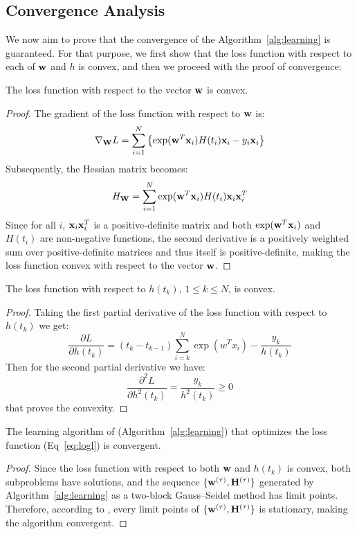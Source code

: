 {\color{red}\subsection{Convergence Analysis}

We now aim to prove that the convergence of the Algorithm~\ref{alg:learning} is guaranteed. For that purpose, we first show that the loss function with respect to each of $\mathbf{w}$ and $h$ is convex, and then we proceed with the proof of convergence:

\begin{lemma}
The loss function with respect to the vector $\mathbf{w}$ is convex.
\end{lemma}
\begin{proof}
The gradient of the loss function with respect to $\mathbf{w}$ is:
\[\nabla_{\mathbf{W}}L=\sum_{i=1}^{N}\left\lbrace\exp(\mathbf{w}^T\mathbf{x}_i)H(t_i)\mathbf{x}_i-y_i\mathbf{x}_i\right\rbrace\]
Subsequently, the Hessian matrix becomes:
\[H_{\mathbf{W}}=\sum_{i=1}^{N}\exp(\mathbf{w}^T\mathbf{x}_i)H(t_i)\mathbf{x}_i\mathbf{x}_i^T\]
Since for all $i$, $\mathbf{x}_i\mathbf{x}_i^T$ is a positive-definite matrix and both $\exp(\mathbf{w}^T\mathbf{x}_i)$ and $H(t_i)$ are non-negative functions, the second derivative is a positively weighted sum over positive-definite matrices and thus itself is positive-definite, making the loss function convex with respect to the vector $\mathbf{w}$.
\end{proof}

\begin{lemma}
	The loss function with respect to $h(t_k)$, $1\le k \le N$, is convex.
\end{lemma}
\begin{proof}
	Taking the first partial derivative of the loss function with respect to $h(t_k)$ we get:
\[\frac{\partial L}{\partial h(t_k)}=(t_k-t_{k-1})\sum_{i=k}^{N}\exp(w^Tx_i)-\frac{y_k}{h(t_k)}\]
Then for the second partial derivative we have:
\[\frac{\partial^2 L}{\partial h^2(t_k)}=\frac{y_k}{h^2(t_k)} \ge 0\]
that proves the convexity.
\end{proof}

\begin{theorem}
The learning algorithm of \npglm (Algorithm~\ref{alg:learning}) that optimizes the loss function (Eq~\ref{eq:logl}) is convergent.
\end{theorem}
\begin{proof}
Since the loss function with respect to both $\mathbf{w}$ and $h(t_k)$ is convex, both subproblems have solutions, and the sequence $\lbrace\mathbf{w}^{(\tau)},\mathbf{H}^{(\tau)}\rbrace$ generated by Algorithm~\ref{alg:learning} as a two-block Gauss–Seidel method has limit points. Therefore, according to \cite{grippo2000convergence}, every limit points of $\lbrace\mathbf{w}^{(\tau)},\mathbf{H}^{(\tau)}\rbrace$ is stationary, making the algorithm convergent.
\end{proof}}

